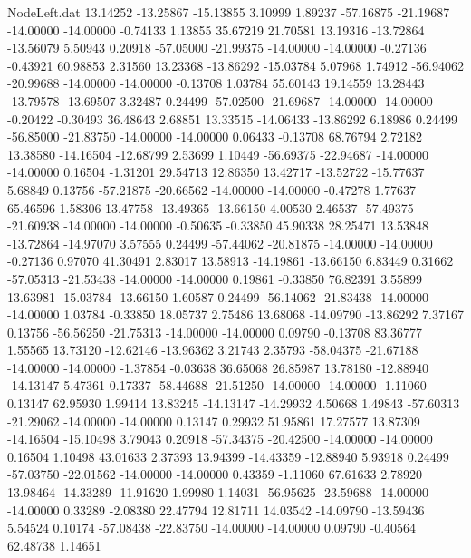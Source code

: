 \begin{filecontents}{NodeLeft.dat}
  13.14252  -13.25867  -15.13855     3.10999    1.89237  -57.16875  -21.19687  -14.00000  -14.00000   -0.74133    1.13855   35.67219   21.70581
  13.19316  -13.72864  -13.56079     5.50943    0.20918  -57.05000  -21.99375  -14.00000  -14.00000   -0.27136   -0.43921   60.98853    2.31560
  13.23368  -13.86292  -15.03784     5.07968    1.74912  -56.94062  -20.99688  -14.00000  -14.00000   -0.13708    1.03784   55.60143   19.14559
  13.28443  -13.79578  -13.69507     3.32487    0.24499  -57.02500  -21.69687  -14.00000  -14.00000   -0.20422   -0.30493   36.48643    2.68851
  13.33515  -14.06433  -13.86292     6.18986    0.24499  -56.85000  -21.83750  -14.00000  -14.00000    0.06433   -0.13708   68.76794    2.72182
  13.38580  -14.16504  -12.68799     2.53699    1.10449  -56.69375  -22.94687  -14.00000  -14.00000    0.16504   -1.31201   29.54713   12.86350
  13.42717  -13.52722  -15.77637     5.68849    0.13756  -57.21875  -20.66562  -14.00000  -14.00000   -0.47278    1.77637   65.46596    1.58306
  13.47758  -13.49365  -13.66150     4.00530    2.46537  -57.49375  -21.60938  -14.00000  -14.00000   -0.50635   -0.33850   45.90338   28.25471
  13.53848  -13.72864  -14.97070     3.57555    0.24499  -57.44062  -20.81875  -14.00000  -14.00000   -0.27136    0.97070   41.30491    2.83017
  13.58913  -14.19861  -13.66150     6.83449    0.31662  -57.05313  -21.53438  -14.00000  -14.00000    0.19861   -0.33850   76.82391    3.55899
  13.63981  -15.03784  -13.66150     1.60587    0.24499  -56.14062  -21.83438  -14.00000  -14.00000    1.03784   -0.33850   18.05737    2.75486
  13.68068  -14.09790  -13.86292     7.37167    0.13756  -56.56250  -21.75313  -14.00000  -14.00000    0.09790   -0.13708   83.36777    1.55565
  13.73120  -12.62146  -13.96362     3.21743    2.35793  -58.04375  -21.67188  -14.00000  -14.00000   -1.37854   -0.03638   36.65068   26.85987
  13.78180  -12.88940  -14.13147     5.47361    0.17337  -58.44688  -21.51250  -14.00000  -14.00000   -1.11060    0.13147   62.95930    1.99414
  13.83245  -14.13147  -14.29932     4.50668    1.49843  -57.60313  -21.29062  -14.00000  -14.00000    0.13147    0.29932   51.95861   17.27577
  13.87309  -14.16504  -15.10498     3.79043    0.20918  -57.34375  -20.42500  -14.00000  -14.00000    0.16504    1.10498   43.01633    2.37393
  13.94399  -14.43359  -12.88940     5.93918    0.24499  -57.03750  -22.01562  -14.00000  -14.00000    0.43359   -1.11060   67.61633    2.78920
  13.98464  -14.33289  -11.91620     1.99980    1.14031  -56.95625  -23.59688  -14.00000  -14.00000    0.33289   -2.08380   22.47794   12.81711
  14.03542  -14.09790  -13.59436     5.54524    0.10174  -57.08438  -22.83750  -14.00000  -14.00000    0.09790   -0.40564   62.48738    1.14651

\end{filecontents}
